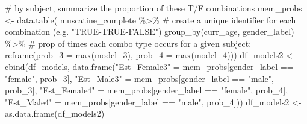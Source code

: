 \documentclass[
  letterpaper,
  DIV=11,
  numbers=noendperiod]{scrreprt}
\newenvironment{Shaded}{\begin{snugshade}}{\end{snugshade}}
\newcommand{\AttributeTok}[1]{\textcolor[rgb]{0.40,0.45,0.13}{#1}}
\newcommand{\CommentTok}[1]{\textcolor[rgb]{0.37,0.37,0.37}{#1}}
\newcommand{\FunctionTok}[1]{\textcolor[rgb]{0.28,0.35,0.67}{#1}}
\newcommand{\NormalTok}[1]{\textcolor[rgb]{0.00,0.23,0.31}{#1}}
\newcommand{\OtherTok}[1]{\textcolor[rgb]{0.00,0.23,0.31}{#1}}
\newcommand{\SpecialCharTok}[1]{\textcolor[rgb]{0.37,0.37,0.37}{#1}}
\newcommand{\StringTok}[1]{\textcolor[rgb]{0.13,0.47,0.30}{#1}}
\begin{document}
\begin{Shaded}
\begin{Highlighting}[]
\CommentTok{\# by subject, summarize the proportion of these T/F combinations }
\NormalTok{mem\_probs }\OtherTok{\textless{}{-}} \FunctionTok{data.table}\NormalTok{( muscatine\_complete }\SpecialCharTok{\%\textgreater{}\%}
  \CommentTok{\# create a unique identifier for each combination (e.g. "TRUE{-}TRUE{-}FALSE")}
  \FunctionTok{group\_by}\NormalTok{(curr\_age, gender\_label) }\SpecialCharTok{\%\textgreater{}\%}
  \CommentTok{\# prop of times each combo type occurs for a given subject:}
  \FunctionTok{reframe}\NormalTok{(}\AttributeTok{prob\_3 =} \FunctionTok{max}\NormalTok{(model\_3),}
          \AttributeTok{prob\_4 =} \FunctionTok{max}\NormalTok{(model\_4)))}
\NormalTok{df\_models2 }\OtherTok{\textless{}{-}} \FunctionTok{cbind}\NormalTok{(df\_models, }\FunctionTok{data.frame}\NormalTok{(}\StringTok{"Est\_Female3"} \OtherTok{=}\NormalTok{ mem\_probs[gender\_label }\SpecialCharTok{==} \StringTok{"female"}\NormalTok{, prob\_3],}
                                          \StringTok{"Est\_Male3"} \OtherTok{=}\NormalTok{ mem\_probs[gender\_label }\SpecialCharTok{==} \StringTok{"male"}\NormalTok{, prob\_3],}
                                          \StringTok{"Est\_Female4"} \OtherTok{=}\NormalTok{ mem\_probs[gender\_label }\SpecialCharTok{==} \StringTok{"female"}\NormalTok{, prob\_4],}
                                          \StringTok{"Est\_Male4"} \OtherTok{=}\NormalTok{ mem\_probs[gender\_label }\SpecialCharTok{==} \StringTok{"male"}\NormalTok{, prob\_4]))}
\NormalTok{df\_models2 }\OtherTok{\textless{}{-}} \FunctionTok{as.data.frame}\NormalTok{(df\_models2)}
\end{Highlighting}
\end{Shaded}
\end{document}
